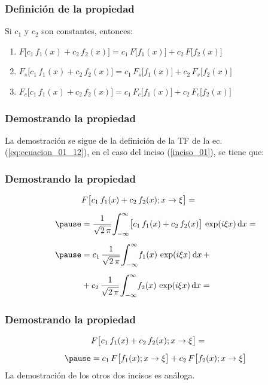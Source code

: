 \begin{frame}
\frametitle{Definición de la propiedad}
Si $c_{1}$ y $c_{2}$ son constantes, entonces:
\pause
{}
\begin{enumerate}[<+->]
\item \label{inciso_01} $F \big[ c_{1} \, f_{1} (x) + c_{2} \, f_{2} (x) \big] = c_{1} \, F \big[ f_{1} (x) \big] + c_{2} \, F \big[ f_{2} (x) \big]$
\item $F_{s} \big[ c_{1} \, f_{1} (x) + c_{2} \, f_{2} (x) \big] = c_{1} \, F_{s} \big[ f_{1} (x) \big] + c_{2} \, F_{s} \big[ f_{2} (x) \big]$
\item $F_{c} \big[ c_{1} \, f_{1} (x) + c_{2} \, f_{2} (x) \big] = c_{1} \, F_{c} \big[ f_{1} (x) \big] + c_{2} \, F_{c} \big[ f_{2} (x) \big]$
\end{enumerate}
\end{frame}
\begin{frame}
\frametitle{Demostrando la propiedad}
La demostración se sigue de la definición de la TF de la ec. (\ref{eq:ecuacion_01_12}), en el caso del inciso (\ref{inciso_01}), se tiene que:
\end{frame}
\begin{frame}
\frametitle{Demostrando la propiedad}
\begin{eqnarray*}
\begin{aligned}
&F \big[ c_{1} \, f_{1} (x) + c_{2} \, f_{2} (x) ; x \to \xi \big] = \\[0.5em] \pause
&= \dfrac{1}{\sqrt{2 \, \pi}} \scaleint{6ex}_{\bs -\infty}^{\infty} \big[ c_{1} \, f_{1} (x) + c_{2} \, f_{2} (x) \big] \, \exp(i \xi x) \dd{x} = \\[0.5em] \pause
&= c_{1} \, \dfrac{1}{\sqrt{2 \, \pi}} \scaleint{6ex}_{\bs -\infty}^{\infty} f_{1}(x) \, \exp(i \xi x) \dd{x} + \\[0.5em]
&+ c_{2} \, \dfrac{1}{\sqrt{2 \, \pi}} \scaleint{6ex}_{\bs -\infty}^{\infty} f_{2}(x) \, \exp(i \xi x) \dd{x} = 
\end{aligned}
\end{eqnarray*}
\end{frame}
\begin{frame}
\frametitle{Demostrando la propiedad}
\begin{eqnarray*}
\begin{aligned}
&F \big[ c_{1} \, f_{1} (x) + c_{2} \, f_{2} (x) ; x \to \xi \big] = \\[0.5em] \pause
&= c_{1} \, F \big[ f_{1} (x) ; x \to \xi \big] + c_{2} \, F \big[ f_{2} (x) ; x \to \xi \big]
\end{aligned}
\end{eqnarray*}
La demostración de los otros dos incisos es análoga.
\end{frame}

